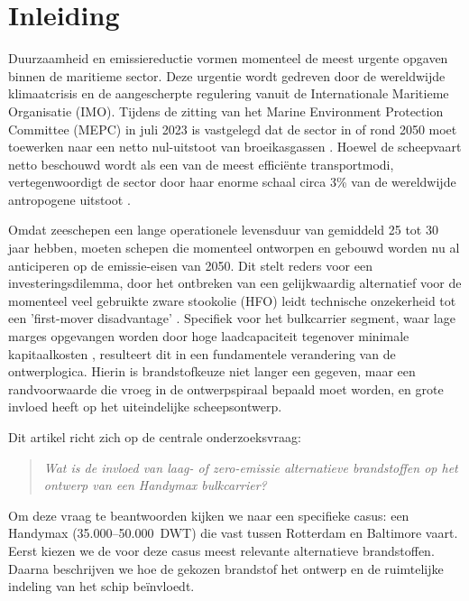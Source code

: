 \documentclass[a4paper]{IMDC2024}
\begin{document}
\newpage

\section{Inleiding}

Duurzaamheid en emissiereductie vormen momenteel de meest urgente opgaven binnen de maritieme sector. Deze urgentie wordt gedreven door de wereldwijde klimaatcrisis en de aangescherpte regulering vanuit de Internationale Maritieme Organisatie (IMO). Tijdens de zitting van het Marine Environment Protection Committee (MEPC) in juli 2023 is vastgelegd dat de sector in of rond 2050 moet toewerken naar een netto nul-uitstoot van broeikasgassen \citep{tadros2023}. Hoewel de scheepvaart netto beschouwd wordt als een van de meest efficiënte transportmodi, vertegenwoordigt de sector door haar enorme schaal circa 3\% van de wereldwijde antropogene uitstoot \citep{imo2020}.

Omdat zeeschepen een lange operationele levensduur van gemiddeld 25 tot 30 jaar hebben, moeten schepen die momenteel ontworpen en gebouwd worden nu al anticiperen op de emissie-eisen van 2050. Dit stelt reders voor een investeringsdilemma, door het ontbreken van een gelijkwaardig alternatief voor de momenteel veel gebruikte zware stookolie (HFO) leidt technische onzekerheid tot een 'first-mover disadvantage' \citep{AbhilashaFullonton}. Specifiek voor het bulkcarrier segment, waar lage marges opgevangen worden door hoge laadcapaciteit tegenover minimale kapitaalkosten \citep{lindstad2022}, resulteert dit in een fundamentele verandering van de ontwerplogica. Hierin is brandstofkeuze niet langer een gegeven, maar een randvoorwaarde die vroeg in de ontwerpspiraal bepaald moet worden, en grote invloed heeft op het uiteindelijke scheepsontwerp.

Dit artikel richt zich op de centrale onderzoeksvraag:
\begin{quote}
    \textit{Wat is de invloed van laag- of zero-emissie alternatieve brandstoffen op het ontwerp van een Handymax bulkcarrier?}
\end{quote}

Om deze vraag te beantwoorden kijken we naar een specifieke casus: een Handymax (35.000--50.000~DWT) die vast tussen Rotterdam en Baltimore vaart. Eerst kiezen we de voor deze casus meest relevante alternatieve brandstoffen. Daarna beschrijven we hoe de gekozen brandstof het ontwerp en de ruimtelijke indeling van het schip beïnvloedt.
\end{document}
